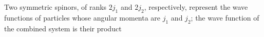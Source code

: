 Two symmetric spinors, of ranks $2j_1$ and $2j_2$, respectively, represent the wave functions of particles whose angular momenta are $j_1$ and $j_2$; the wave function of the combined system is their product
